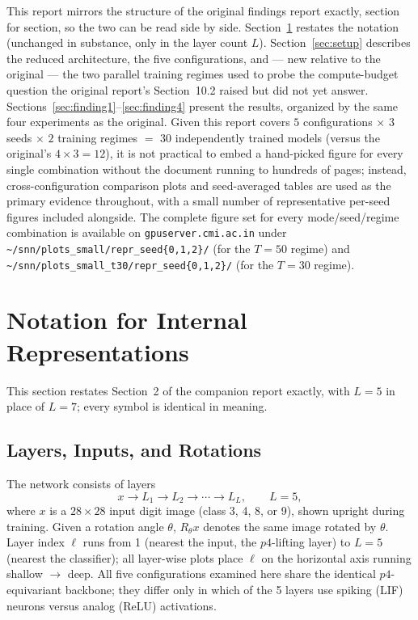 \documentclass[11pt]{article}
\begin{document}
This report mirrors the structure of the original findings report exactly, section for section, so
the two can be read side by side. Section~\ref{sec:notation} restates the notation (unchanged in
substance, only in the layer count $L$). Section~\ref{sec:setup} describes the reduced architecture,
the five configurations, and --- new relative to the original --- the two parallel training regimes
used to probe the compute-budget question the original report's Section~10.2 raised but did not yet
answer. Sections~\ref{sec:finding1}--\ref{sec:finding4} present the results, organized by the same
four experiments as the original. Given this report covers $5$ configurations $\times$ $3$ seeds
$\times$ $2$ training regimes $=$ $30$ independently trained models (versus the original's $4 \times
3 = 12$), it is not practical to embed a hand-picked figure for every single combination without the
document running to hundreds of pages; instead, cross-configuration comparison plots and seed-averaged
tables are used as the primary evidence throughout, with a small number of representative per-seed
figures included alongside. The complete figure set for every mode/seed/regime combination is
available on \texttt{gpuserver.cmi.ac.in} under \texttt{\textasciitilde/snn/plots\_small/repr\_seed\{0,1,2\}/}
(for the $T=50$ regime) and \texttt{\textasciitilde/snn/plots\_small\_t30/repr\_seed\{0,1,2\}/} (for
the $T=30$ regime).

\section{Notation for Internal Representations}
\label{sec:notation}

This section restates Section~2 of the companion report exactly, with $L=5$ in place of $L=7$; every
symbol is identical in meaning.

\subsection{Layers, Inputs, and Rotations}

The network consists of layers
\[
x \to L_1 \to L_2 \to \cdots \to L_L, \qquad L = 5,
\]
where $x$ is a $28 \times 28$ input digit image (class 3, 4, 8, or 9), shown upright during training.
Given a rotation angle $\theta$, $R_\theta x$ denotes the same image rotated by $\theta$. Layer index
$\ell$ runs from 1 (nearest the input, the $p4$-lifting layer) to $L=5$ (nearest the classifier); all
layer-wise plots place $\ell$ on the horizontal axis running shallow $\to$ deep. All five
configurations examined here share the identical $p4$-equivariant backbone; they differ only in which
of the 5 layers use spiking (LIF) neurons versus analog (ReLU) activations.
\end{document}
